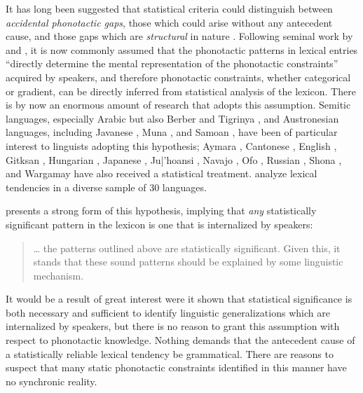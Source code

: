 \label{turkish}

It has long been suggested that statistical criteria could distinguish between \emph{accidental phonotactic gaps}, those which could arise without any antecedent cause, and those gaps which are \emph{structural} in nature \citep[e.g.,][]{Fischer-Jorgensen1952,Saporta1955,Saporta1958,Vogt1954}.
Following seminal work by \citet{Mester1988} and \citet{McCarthy1988}, it is now commonly assumed that the phonotactic patterns in lexical entries ``directly determine the mental representation of the phonotactic constraints'' \citep[180]{Frisch2004} acquired by speakers, and therefore phonotactic constraints, whether categorical or gradient, can be directly inferred from statistical analysis of the lexicon.
There is by now an enormous amount of research that adopts this assumption.
Semitic languages, especially Arabic \citep{Coetzee2008a,Frisch2004,McCarthy1988,Pierrehumbert1993} but also Berber \citep{Elmedlaoui1995} and Tigrinya \citep{Buckley1997}, and Austronesian languages, including Javanese \citep{GraffInPress,Mester1988}, Muna \citep{Anttila2008a,Coetzee2008a}, and Samoan \citep{AldereteInPress}, have been of particular interest to linguists adopting this hypothesis; Aymara \citep{GraffInPress}, Cantonese \citep{Yip1989}, English \citep{Berkley1994a,Berkley1994b,Berkley2000,Coetzee2008b,Davis1989,Martin2007,Martin2011}, Gitksan \citep{Brown2010}, Hungarian \citep{Grimes2010}, Japanese \citep{Kawahara2006}, Ju|'hoansi \citep{Kinney2005}, Navajo \citep{Martin2007,Martin2011}, Ofo \citep[38f.]{MacEachern1999}, Russian \citep{Padgett1991,Padgett1992}, Shona \citep{Hayes2008a}, and Wargamay \citep{Hayes2008a} have also received a statistical treatment. 
\citet{Pozdniakov2007} analyze lexical tendencies in a diverse sample of 30 languages.

\citet{Brown2010} presents a strong form of this hypothesis, implying that \emph{any} statistically significant pattern in the lexicon is one that is internalized by speakers:

\begin{quote}
\ldots{} the patterns outlined above are statistically significant. Given this, it stands that these sound patterns should be explained by some linguistic mechanism. \citep[][48]{Brown2010}
\end{quote}

It would be a result of great interest were it shown that statistical significance is both necessary and sufficient to identify linguistic generalizations which are internalized by speakers, but there is no reason to grant this assumption with respect to phonotactic knowledge.
Nothing demands that the antecedent cause of a statistically reliable lexical tendency be grammatical. 
There are reasons to suspect that many static phonotactic constraints identified in this manner have no synchronic reality.

